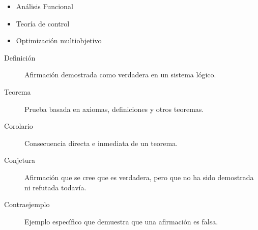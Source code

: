 \begin{exampletwoup}
\begin{itemize}
\item Análisis Funcional

\item Teoría de control

\item Optimización multiobjetivo
\end{itemize}

\begin{description}
\item[Definición] Afirmación demostrada como verdadera
en un sistema lógico.

\item[Teorema] Prueba basada en axiomas, definiciones
y otros teoremas.

\item[Corolario] Consecuencia directa e inmediata
de un teorema.

\item[Conjetura] Afirmación que se cree que es
verdadera, pero que no ha sido demostrada ni
refutada todavía.

\item[Contraejemplo] Ejemplo específico que demuestra
que una afirmación es falsa.
\end{description}
\end{exampletwoup}
